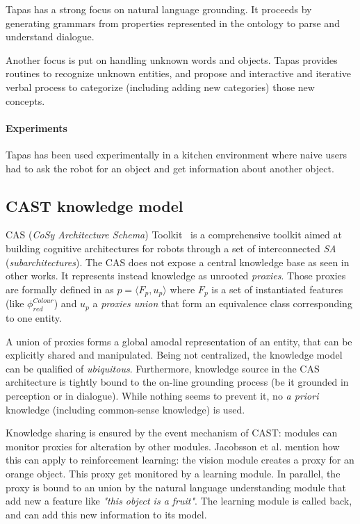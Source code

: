 {\sc Tapas} has a strong focus on natural language grounding. It proceeds by
generating grammars from properties represented in the ontology to parse and
understand dialogue.

Another focus is put on handling unknown words and objects. {\sc Tapas}
provides routines to recognize unknown entities, and propose and interactive
and iterative verbal process to categorize (including adding new categories)
those new concepts.

\paragraph{Experiments} {\sc Tapas} has been used experimentally in a kitchen
environment where naive users had to ask the robot for an object and get
information about another object.

\subsection{CAST knowledge model}
\label{sect|cast}

CAS (\emph{CoSy Architecture Schema}) Toolkit~\cite{Hawes2007} is a
comprehensive toolkit aimed at building cognitive architectures for robots
through a set of interconnected \emph{SA} (\emph{subarchitectures}). The CAS
does not expose a central knowledge base as seen in other works. It represents
instead knowledge as unrooted \emph{proxies}. Those proxies are formally
defined in \cite{Jacobsson2008} as $p= \langle F_p, u_p \rangle$ where $F_p$ is
a set of instantiated features (like $\phi^{Colour}_{red}$) and $u_p$ a
\emph{proxies union} that form an equivalence class corresponding to one
entity.

A union of proxies forms a global amodal representation of an entity, that can
be explicitly shared and manipulated. Being not centralized, the knowledge
model can be qualified of \emph{ubiquitous}. Furthermore, knowledge source in
the CAS architecture is tightly bound to the on-line grounding process (be it
grounded in perception or in dialogue). While nothing seems to prevent it, no
{\it a priori} knowledge (including common-sense knowledge) is used.

Knowledge sharing is ensured by the event mechanism of CAST: modules can
monitor proxies for alteration by other modules. Jacobsson et al. mention how
this can apply to reinforcement learning: the vision module creates a proxy for
an orange object. This proxy get monitored by a learning module. In parallel,
the proxy is bound to an union by the natural language understanding module
that add new a feature like \emph{"this object is a fruit"}. The learning
module is called back, and can add this new information to its model.

